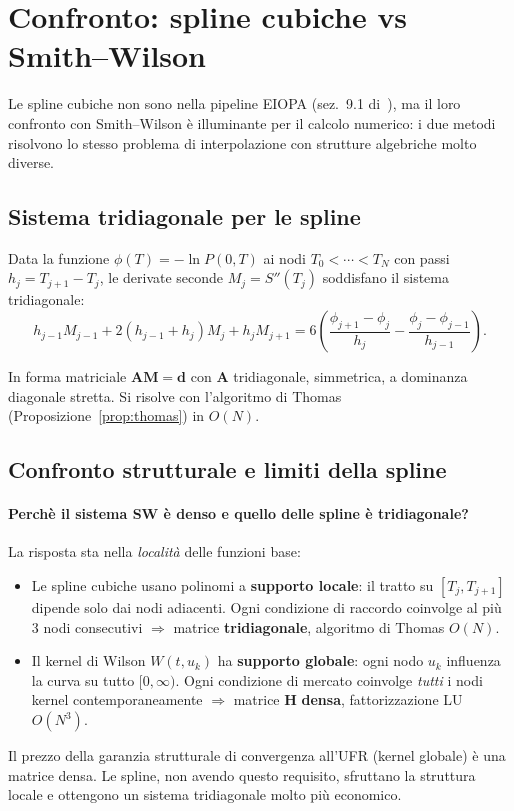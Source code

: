 \documentclass[11pt,a4paper]{article}
\theoremstyle{plain}
\theoremstyle{definition}
\theoremstyle{remark}
\newcommand{\Hmat}{\mathbf{H}}
\begin{document}
\section{Confronto: spline cubiche vs Smith--Wilson}
\label{sec:confronto}

Le spline cubiche non sono nella pipeline EIOPA (sez.~9.1 di~\cite{eiopa2025}),
ma il loro confronto con Smith--Wilson \`e illuminante per il calcolo numerico:
i due metodi risolvono lo stesso problema di interpolazione con strutture
algebriche molto diverse.

\subsection{Sistema tridiagonale per le spline}

Data la funzione $\phi(T) = -\ln P(0,T)$ ai nodi $T_0 < \cdots < T_N$
con passi $h_j = T_{j+1}-T_j$, le derivate seconde $M_j = S''(T_j)$ soddisfano
il sistema tridiagonale:
\begin{equation}
  \label{eq:spline_sys}
  h_{j-1}M_{j-1} + 2(h_{j-1}+h_j)M_j + h_j M_{j+1}
  = 6\!\left(\frac{\phi_{j+1}-\phi_j}{h_j} - \frac{\phi_j-\phi_{j-1}}{h_{j-1}}\right).
\end{equation}

In forma matriciale $\mathbf{A}\mathbf{M} = \mathbf{d}$ con $\mathbf{A}$
tridiagonale, simmetrica, a dominanza diagonale stretta. Si risolve con
l'algoritmo di Thomas (Proposizione~\ref{prop:thomas}) in $O(N)$.

\subsection{Confronto strutturale e limiti della spline}

\paragraph{Perch\`e il sistema SW \`e denso e quello delle spline \`e tridiagonale?}
La risposta sta nella \emph{localit\`a} delle funzioni base:
\begin{itemize}
  \item Le spline cubiche usano polinomi a \textbf{supporto locale}: il tratto
        su $[T_j, T_{j+1}]$ dipende solo dai nodi adiacenti. Ogni condizione di
        raccordo coinvolge al pi\`u 3 nodi consecutivi $\Rightarrow$ matrice
        \textbf{tridiagonale}, algoritmo di Thomas $O(N)$.
  \item Il kernel di Wilson $W(t,u_k)$ ha \textbf{supporto globale}: ogni nodo
        $u_k$ influenza la curva su tutto $[0,\infty)$. Ogni condizione di
        mercato coinvolge \emph{tutti} i nodi kernel contemporaneamente
        $\Rightarrow$ matrice $\Hmat$ \textbf{densa}, fattorizzazione LU $O(N^3)$.
\end{itemize}
Il prezzo della garanzia strutturale di convergenza all'UFR (kernel globale)
\`e una matrice densa. Le spline, non avendo questo requisito, sfruttano la
struttura locale e ottengono un sistema tridiagonale molto pi\`u economico.
\end{document}
